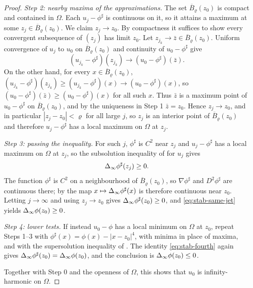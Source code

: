 \begin{proof}
\emph{Step 2: nearby maxima of the approximations.}
The set $\overline B_\varrho(z_0)$ is compact and contained in $\Omega$. Each
$u_j-\phi^\sharp$ is continuous on it, so it attains a maximum at some
$z_j\in\overline B_\varrho(z_0)$. We claim $z_j\to z_0$. By compactness it
suffices to show every convergent subsequence of $(z_j)$ has limit $z_0$. Let
$z_{j_k}\to\bar z\in\overline B_\varrho(z_0)$. Uniform convergence of $u_j$ to
$u_0$ on $\overline B_\varrho(z_0)$ and continuity of $u_0-\phi^\sharp$ give
\[
  (u_{j_k}-\phi^\sharp)(z_{j_k})\longrightarrow(u_0-\phi^\sharp)(\bar z).
\]
On the other hand, for every $x\in\overline B_\varrho(z_0)$,
$(u_{j_k}-\phi^\sharp)(z_{j_k})\ge(u_{j_k}-\phi^\sharp)(x)
 \to(u_0-\phi^\sharp)(x)$, so $(u_0-\phi^\sharp)(\bar z)\ge
 (u_0-\phi^\sharp)(x)$ for all such $x$. Thus $\bar z$ is a maximum point of
$u_0-\phi^\sharp$ on $\overline B_\varrho(z_0)$, and by the uniqueness in Step 1
$\bar z=z_0$. Hence $z_j\to z_0$, and in particular $|z_j-z_0|<\varrho$ for all
large $j$, so $z_j$ is an interior point of $\overline B_\varrho(z_0)$ and
therefore $u_j-\phi^\sharp$ has a local maximum on $\Omega$ at $z_j$.

\emph{Step 3: passing the inequality.}
For such $j$, $\phi^\sharp$ is $C^2$ near $z_j$ and $u_j-\phi^\sharp$ has a
local maximum on $\Omega$ at $z_j$, so the subsolution inequality of
 for $u_j$ gives
\[
  \Delta_{\infty}\phi^\sharp(z_j)\ge0 .
\]
The function $\phi^\sharp$ is $C^2$ on a neighbourhood of
$\overline B_\varrho(z_0)$, so $\nabla\phi^\sharp$ and $D^2\phi^\sharp$ are
continuous there; by  the map $x\mapsto\Delta_{\infty}\phi^\sharp(x)$ is
therefore continuous near $z_0$. Letting $j\to\infty$ and using $z_j\to z_0$
gives $\Delta_{\infty}\phi^\sharp(z_0)\ge0$, and \eqref{eq:stab-same-jet} yields
$\Delta_{\infty}\phi(z_0)\ge0$.

\emph{Step 4: lower tests.}
If instead $u_0-\phi$ has a local minimum on $\Omega$ at $z_0$, repeat Steps 1--3
with $\phi^\sharp(x)=\phi(x)-|x-z_0|^4$, with minima in place of maxima, and with
the supersolution inequality of . The identity
\eqref{eq:stab-fourth} again gives
$\Delta_{\infty}\phi^\sharp(z_0)=\Delta_{\infty}\phi(z_0)$, and the conclusion is
$\Delta_{\infty}\phi(z_0)\le0$.

Together with Step 0 and the openness of $\Omega$, this shows that $u_0$ is
infinity-harmonic on $\Omega$.
\end{proof}
